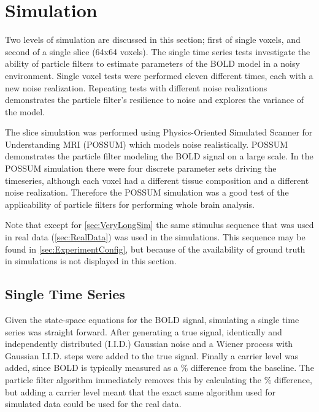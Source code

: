 \chapter{Simulation}
\label{sec:SimulationResults}
Two levels of simulation are discussed in this section; first of single voxels,
and second of a single slice (64x64 voxels).  The single time series tests
investigate the ability of particle filters to estimate parameters of the BOLD model
in a noisy environment. Single voxel tests were
performed eleven different times, each with a new noise realization.
Repeating tests with different noise realizations demonstrates the
particle filter's resilience to noise and explores the variance of
the model.

The slice simulation was performed using
Physics-Oriented Simulated Scanner for Understanding MRI (POSSUM) which
models noise realistically. POSSUM demonstrates the
particle filter modeling the BOLD signal on a large scale.
In the POSSUM simulation there were four
discrete parameter sets driving the timeseries, although each voxel had a
different tissue composition and a different
noise realization. Therefore the POSSUM simulation was
a good test of the applicability of particle filters for performing
whole brain analysis.

Note that except for \autoref{sec:VeryLongSim} the same stimulus sequence
that was used in real data (\autoref{sec:RealData}) was used in the simulations. This sequence may
be found in \autoref{sec:ExperimentConfig}, but because of the availability of ground
truth in simulations is not displayed in this section.

\section{Single Time Series}
\label{sec:Single Voxel Simulation}
Given the state-space equations for the BOLD signal, simulating a single time
series was straight forward. After generating a true signal,
identically and independently distributed (I.I.D.) Gaussian noise and a Wiener
process with Gaussian I.I.D. steps were added to the true signal. Finally a
carrier level was added, since BOLD is typically
measured as a \% difference from the baseline. The particle filter
algorithm immediately removes this by calculating the \% difference,
but adding a carrier level meant that the exact same algorithm used
for simulated data could be used for the real data.

